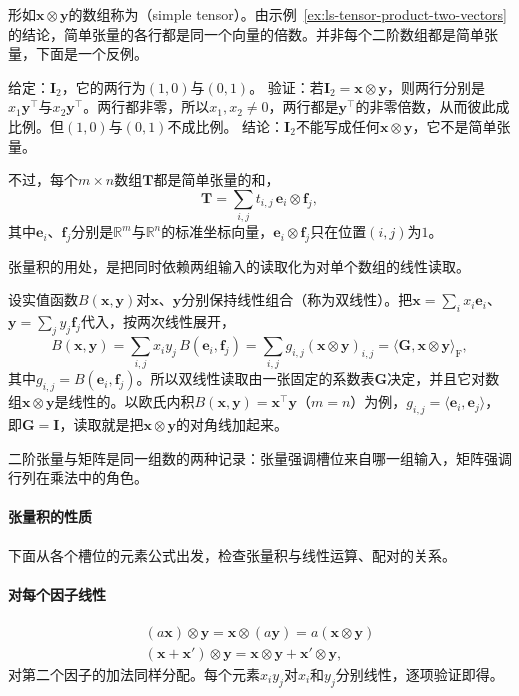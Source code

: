 形如$\bm x\otimes\bm y$的数组称为（simple tensor）。由示例~\ref{ex:ls-tensor-product-two-vectors}的结论，简单张量的各行都是同一个向量的倍数。并非每个二阶数组都是简单张量，下面是一个反例。
\begin{example}[反例：单位矩阵不是简单张量]
\label{ex:ls-identity-not-simple}
给定：$\bm I_2$，它的两行为$(1,0)$与$(0,1)$。
验证：若$\bm I_2=\bm x\otimes\bm y$，则两行分别是$x_1\bm y^\top$与$x_2\bm y^\top$。两行都非零，所以$x_1,x_2\neq0$，两行都是$\bm y^\top$的非零倍数，从而彼此成比例。但$(1,0)$与$(0,1)$不成比例。
结论：$\bm I_2$不能写成任何$\bm x\otimes\bm y$，它不是简单张量。
\end{example}
不过，每个$m\times n$数组$\bm T$都是简单张量的和，
\[
 \bm T=\sum_{i,j}t_{i,j}\,\bm e_i\otimes\bm f_j,
\]
其中$\bm e_i$、$\bm f_j$分别是$\mathbb R^m$与$\mathbb R^n$的标准坐标向量，$\bm e_i\otimes\bm f_j$只在位置$(i,j)$为$1$。

张量积的用处，是把同时依赖两组输入的读取化为对单个数组的线性读取。

设实值函数$B(\bm x,\bm y)$对$\bm x$、$\bm y$分别保持线性组合（称为双线性）。把$\bm x=\sum_ix_i\bm e_i$、$\bm y=\sum_jy_j\bm f_j$代入，按两次线性展开，
\[
 B(\bm x,\bm y)=\sum_{i,j}x_iy_j\,B(\bm e_i,\bm f_j)=\sum_{i,j}g_{i,j}(\bm x\otimes\bm y)_{i,j}
 =\langle\bm G,\bm x\otimes\bm y\rangle_{\mathrm F},
\]
其中$g_{i,j}=B(\bm e_i,\bm f_j)$。所以双线性读取由一张固定的系数表$\bm G$决定，并且它对数组$\bm x\otimes\bm y$是线性的。以欧氏内积$B(\bm x,\bm y)=\bm x^\top\bm y$（$m=n$）为例，$g_{i,j}=\langle\bm e_i,\bm e_j\rangle$，即$\bm G=\bm I$，读取就是把$\bm x\otimes\bm y$的对角线加起来。

二阶张量与矩阵是同一组数的两种记录：张量强调槽位来自哪一组输入，矩阵强调行列在乘法中的角色。

\paragraph{张量积的性质}

下面从各个槽位的元素公式出发，检查张量积与线性运算、配对的关系。

\paragraph{对每个因子线性}
\[
 \begin{gathered}
(a\bm x)\otimes\bm y=\bm x\otimes(a\bm y)=a(\bm x\otimes\bm y)\\
(\bm x+\bm x')\otimes\bm y=\bm x\otimes\bm y+\bm x'\otimes\bm y,
 \end{gathered}
\]
对第二个因子的加法同样分配。每个元素$x_iy_j$对$x_i$和$y_j$分别线性，逐项验证即得。

